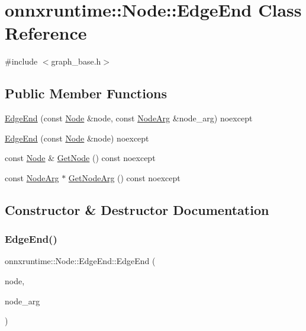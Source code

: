 \hypertarget{classonnxruntime_1_1Node_1_1EdgeEnd}{}\section{onnxruntime\+:\+:Node\+:\+:Edge\+End Class Reference}
\label{classonnxruntime_1_1Node_1_1EdgeEnd}


{\ttfamily \#include $<$graph\+\_\+base.\+h$>$}

\subsection*{Public Member Functions}
\begin{DoxyCompactItemize}
\item 
\mbox{\hyperlink{classonnxruntime_1_1Node_1_1EdgeEnd_a06234fd599240e3ad070d06e91d774ae}{Edge\+End}} (const \mbox{\hyperlink{classonnxruntime_1_1Node}{Node}} \&node, const \mbox{\hyperlink{classonnxruntime_1_1NodeArg}{Node\+Arg}} \&node\+\_\+arg) noexcept
\item 
\mbox{\hyperlink{classonnxruntime_1_1Node_1_1EdgeEnd_ad054e68c646263d36b90ee3db6a91ad3}{Edge\+End}} (const \mbox{\hyperlink{classonnxruntime_1_1Node}{Node}} \&node) noexcept
\item 
const \mbox{\hyperlink{classonnxruntime_1_1Node}{Node}} \& \mbox{\hyperlink{classonnxruntime_1_1Node_1_1EdgeEnd_a5bd74294e77c13d00a8b3a1c85e743b9}{Get\+Node}} () const noexcept
\item 
const \mbox{\hyperlink{classonnxruntime_1_1NodeArg}{Node\+Arg}} $\ast$ \mbox{\hyperlink{classonnxruntime_1_1Node_1_1EdgeEnd_a7a107c4abb1a0a077cb4a1d276e54e48}{Get\+Node\+Arg}} () const noexcept
\end{DoxyCompactItemize}


\subsection{Constructor \& Destructor Documentation}
\mbox{\label{classonnxruntime_1_1Node_1_1EdgeEnd_a06234fd599240e3ad070d06e91d774ae}} 
\subsubsection{\texorpdfstring{Edge\+End()}{EdgeEnd()}\hspace{0.1cm}{\footnotesize\ttfamily [1/2]}}
{\footnotesize\ttfamily onnxruntime\+::\+Node\+::\+Edge\+End\+::\+Edge\+End (\begin{DoxyParamCaption}\item[{const \mbox{\hyperlink{classonnxruntime_1_1Node}{Node}} \&}]{node,  }\item[{const \mbox{\hyperlink{classonnxruntime_1_1NodeArg}{Node\+Arg}} \&}]{node\+\_\+arg }\end{DoxyParamCaption})\hspace{0.3cm}{\ttfamily [noexcept]}}

